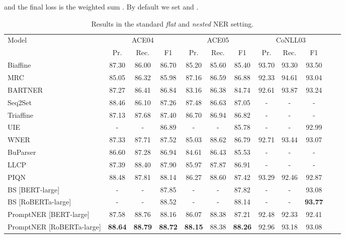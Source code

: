 \documentclass[11pt]{article}
\begin{document}
\noindent and the final loss is the weighted sum . By default we set  and .





\begin{table*}[]
\centering
\small
\begin{tabular}{lccccccccccc}
\toprule
\multirow{2}{*}{Model}   & \multicolumn{3}{c}{ACE04} & \multicolumn{3}{c}{ACE05}   & \multicolumn{3}{c}{CoNLL03} \\

 \cmidrule(lr){2-4}  \cmidrule(lr){5-7} \cmidrule(lr){8-10} 
&  Pr.  & Rec. & F1 & Pr.  & Rec. & F1  & Pr.  & Rec. & F1  \\
\midrule
Biaffine \citep{yu-etal-2020-named}       & 87.30  & 86.00  & 86.70 & 85.20  & 85.60  & 85.40  & 93.70 & 93.30 & 93.50 \\
MRC \citep{li-etal-2020-unified} & 85.05 & 86.32 &  85.98 & 87.16 & 86.59 & 86.88 & 92.33 & 94.61 & 93.04\\
BARTNER \citep{yan-etal-2021-unified-generative} & 87.27 & 86.41 & 86.84 & 83.16 & 86.38 & 84.74 & 92.61  & 93.87 & 93.24  \\
Seq2Set \citep{ijcai2021-542} & 88.46 & 86.10 & 87.26 & 87.48 & 86.63 & 87.05 & - & - & - \\
Triaffine \citep{yuan-etal-2022-fusing} & 87.13 &  87.68 &  87.40 &  86.70 &  86.94 &  86.82 & - & - & - \\
UIE \citep{lu-etal-2022-unified} & - & - & 86.89 & - & - & 85.78 & - & - & 92.99 \\
WNER \citep{li2022unified} & 87.33 &  87.71 &  87.52 & 85.03 & 
88.62 &  86.79 & 92.71 &  93.44 &  93.07 \\
BuParser\citep{yang-tu-2022-bottom} & 86.60  &  87.28   & 86.94  &  84.61  &  86.43  &  85.53  & - & - & - \\
LLCP \cite{lou-etal-2022-nested} & 87.39 &  88.40 &  87.90 &  85.97 &  87.87 &  86.91  & - & - & - \\
PIQN \citep{shen-etal-2022-parallel} & 88.48 & 87.81 & 88.14 & 86.27 & 88.60 & 87.42 & 93.29 & 92.46 & 92.87  \\
BS [BERT-large] \citep{zhu-li-2022-boundary} & - & - &  87.85 & - &  - &  87.82 &  - &  - &  {93.08} \\
BS [RoBERTa-large] \citep{zhu-li-2022-boundary} & - & - &  88.52 & - &  - &  88.14 &  - &  - &  \textbf{93.77} \\
\midrule
PromptNER [BERT-large] & 87.58 & 88.76 & 88.16 & 86.07 & 88.38 & 87.21  & 92.48 & 92.33 & 92.41 \\
PromptNER [RoBERTa-large] & \textbf{88.64} & \textbf{88.79} & \textbf{88.72} & \textbf{88.15} & {88.38} & \textbf{88.26} & 92.96 & 93.18 & 93.08\\
\bottomrule
\end{tabular}
\caption{Results in the standard \textit{flat} and \textit{nested} NER setting.}
\label{tab:sup}
\end{table*}
\end{document}
